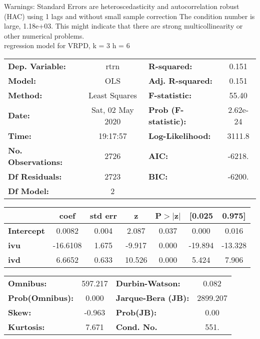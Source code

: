 Warnings: \newline
 [1] Standard Errors are heteroscedasticity and autocorrelation robust (HAC) using 1 lags and without small sample correction \newline
 [2] The condition number is large, 1.18e+03. This might indicate that there are \newline
 strong multicollinearity or other numerical problems.\\ 

regression model for VRPD, k = 3 h = 6\begin{center}
\begin{tabular}{lclc}
\toprule
\textbf{Dep. Variable:}    &       rtrn       & \textbf{  R-squared:         } &     0.151   \\
\textbf{Model:}            &       OLS        & \textbf{  Adj. R-squared:    } &     0.151   \\
\textbf{Method:}           &  Least Squares   & \textbf{  F-statistic:       } &     55.40   \\
\textbf{Date:}             & Sat, 02 May 2020 & \textbf{  Prob (F-statistic):} &  2.62e-24   \\
\textbf{Time:}             &     19:17:57     & \textbf{  Log-Likelihood:    } &    3111.8   \\
\textbf{No. Observations:} &        2726      & \textbf{  AIC:               } &    -6218.   \\
\textbf{Df Residuals:}     &        2723      & \textbf{  BIC:               } &    -6200.   \\
\textbf{Df Model:}         &           2      & \textbf{                     } &             \\
\bottomrule
\end{tabular}
\begin{tabular}{lcccccc}
                   & \textbf{coef} & \textbf{std err} & \textbf{z} & \textbf{P$> |$z$|$} & \textbf{[0.025} & \textbf{0.975]}  \\
\midrule
\textbf{Intercept} &       0.0082  &        0.004     &     2.087  &         0.037        &        0.000    &        0.016     \\
\textbf{ivu}       &     -16.6108  &        1.675     &    -9.917  &         0.000        &      -19.894    &      -13.328     \\
\textbf{ivd}       &       6.6652  &        0.633     &    10.526  &         0.000        &        5.424    &        7.906     \\
\bottomrule
\end{tabular}
\begin{tabular}{lclc}
\textbf{Omnibus:}       & 597.217 & \textbf{  Durbin-Watson:     } &    0.082  \\
\textbf{Prob(Omnibus):} &   0.000 & \textbf{  Jarque-Bera (JB):  } & 2899.207  \\
\textbf{Skew:}          &  -0.963 & \textbf{  Prob(JB):          } &     0.00  \\
\textbf{Kurtosis:}      &   7.671 & \textbf{  Cond. No.          } &     551.  \\
\bottomrule
\end{tabular}
\end{center}

